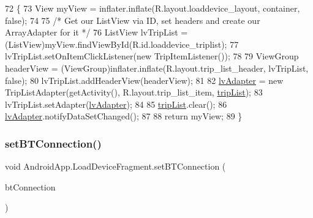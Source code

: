 \begin{DoxyCode}
72                                                                                                       \{
73         View myView = inflater.inflate(R.layout.loaddevice\_layout, container, \textcolor{keyword}{false});
74 
75         \textcolor{comment}{/* Get our ListView via ID, set headers and create our ArrayAdapter for it */}
76         ListView lvTripList = (ListView)myView.findViewById(R.id.loaddevice\_triplist);
77         lvTripList.setOnItemClickListener(\textcolor{keyword}{new} TripItemListener());
78 
79         ViewGroup headerView = (ViewGroup)inflater.inflate(R.layout.trip\_list\_header, lvTripList, \textcolor{keyword}{false});
80         lvTripList.addHeaderView(headerView);
81 
82         \hyperlink{class_android_app_1_1_load_device_fragment_a96c2356cc65e934741c31ff3839ed9d3}{lvAdapter} = \textcolor{keyword}{new} TripListAdapter(getActivity(), R.layout.trip\_list\_item, 
      \hyperlink{class_android_app_1_1_load_device_fragment_a23e4856334c9782e15f7f7a08b544f4c}{tripList});
83         lvTripList.setAdapter(\hyperlink{class_android_app_1_1_load_device_fragment_a96c2356cc65e934741c31ff3839ed9d3}{lvAdapter});
84 
85         \hyperlink{class_android_app_1_1_load_device_fragment_a23e4856334c9782e15f7f7a08b544f4c}{tripList}.clear();
86         \hyperlink{class_android_app_1_1_load_device_fragment_a96c2356cc65e934741c31ff3839ed9d3}{lvAdapter}.notifyDataSetChanged();
87 
88         \textcolor{keywordflow}{return} myView;
89     \}
\end{DoxyCode}
\mbox{\label{class_android_app_1_1_load_device_fragment_a77ce93090f6c8c6aac522e35bfe9d21b}} 
\subsubsection{\texorpdfstring{set\+B\+T\+Connection()}{setBTConnection()}}
{\footnotesize\ttfamily void Android\+App.\+Load\+Device\+Fragment.\+set\+B\+T\+Connection (\begin{DoxyParamCaption}\item[{\hyperlink{class_android_app_1_1_b_t_connection}{B\+T\+Connection}}]{bt\+Connection }\end{DoxyParamCaption})\hspace{0.3cm}{\ttfamily [inline]}}



